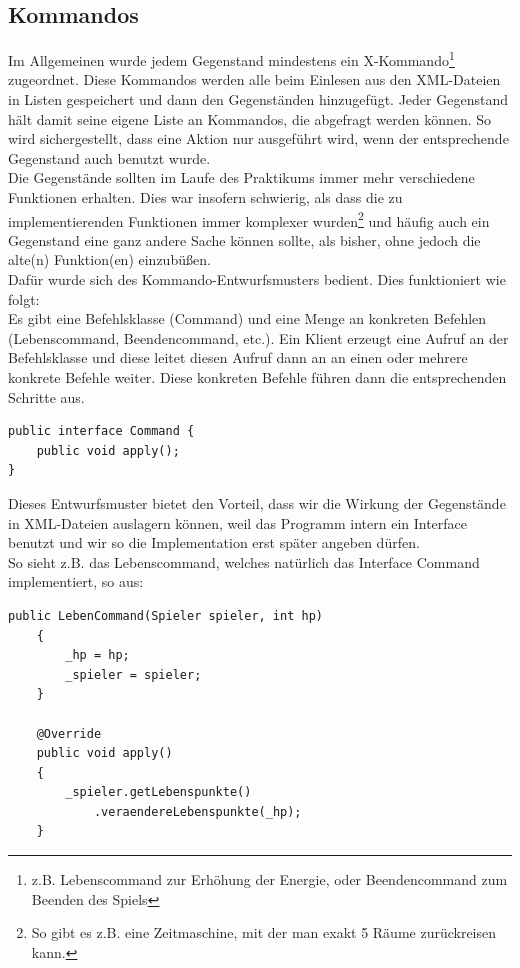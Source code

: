 \documentclass[12pt,twoside]{article}
\theoremstyle{plain}
\theoremstyle{definition}
\theoremstyle{remark}
\begin{document}
\subsection{Kommandos}
\label{ssec:main_commands}
Im Allgemeinen wurde jedem Gegenstand mindestens ein X-Kommando\footnote{z.B. Lebenscommand zur Erhöhung der Energie, oder Beendencommand zum Beenden des Spiels} zugeordnet.
Diese Kommandos werden alle beim Einlesen aus den XML-Dateien in Listen gespeichert und dann den Gegenständen hinzugefügt.
Jeder Gegenstand hält damit seine eigene Liste an Kommandos, die abgefragt werden können. So wird sichergestellt, dass eine Aktion nur ausgeführt wird, wenn der entsprechende Gegenstand auch benutzt wurde.\\
Die Gegenstände sollten im Laufe des Praktikums immer mehr verschiedene Funktionen erhalten.
Dies war insofern schwierig, als dass die zu implementierenden Funktionen immer komplexer wurden\footnote{So gibt es z.B. eine Zeitmaschine, mit der man exakt 5 Räume zurückreisen kann.} und häufig auch ein Gegenstand eine ganz andere Sache können sollte, als bisher, ohne jedoch die alte(n) Funktion(en) einzubüßen.\\
Dafür wurde sich des Kommando-Entwurfsmusters bedient. Dies funktioniert wie folgt:\\
Es gibt eine Befehlsklasse (Command) und eine Menge an konkreten Befehlen (Lebenscommand, Beendencommand, etc.). Ein Klient erzeugt eine Aufruf an der Befehlsklasse und diese leitet diesen Aufruf dann an an einen oder mehrere konkrete Befehle weiter. Diese konkreten Befehle führen dann die entsprechenden Schritte aus.
\begin{lstlisting}[caption=Unser Command-Interface, label=code:main_command]
public interface Command {
	public void apply();
}
\end{lstlisting}
Dieses Entwurfsmuster bietet den Vorteil, dass wir die Wirkung der Gegenstände in XML-Dateien auslagern können, weil das Programm intern ein Interface benutzt und wir so die Implementation erst später angeben dürfen.
\\
So sieht z.B. das Lebenscommand, welches natürlich das Interface Command implementiert, so aus:
\begin{lstlisting}[caption=LebenCommand - eine implementation des Command-Interfaces, label=code:main_lebencommand]
public LebenCommand(Spieler spieler, int hp)
    {
        _hp = hp;
        _spieler = spieler;
    }

    @Override
    public void apply()
    {
        _spieler.getLebenspunkte()
            .veraendereLebenspunkte(_hp);
    }
\end{lstlisting}
\end{document}
